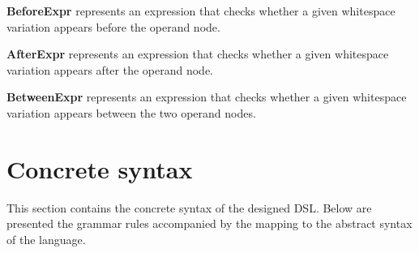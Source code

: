 \documentclass[parskip=full]{uvamscse}
\begin{document}
\begin{description}
\item\textbf{BeforeExpr} represents an expression that checks whether a given whitespace variation appears before the operand node.

\item\textbf{AfterExpr} represents an expression that checks whether a given whitespace variation appears after the operand node.

\item\textbf{BetweenExpr} represents an expression that checks whether a given whitespace variation appears between the two operand nodes.

\end{description}

\section{Concrete syntax}

This section contains the concrete syntax of the designed DSL. Below are presented the grammar rules accompanied by the mapping to the abstract syntax of the language.
\end{document}
